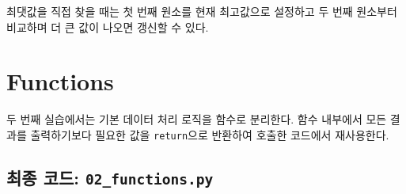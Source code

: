 \documentclass[11pt,a4paper]{article}
\begin{document}
\begin{importantbox}
최댓값을 직접 찾을 때는 첫 번째 원소를 현재 최고값으로 설정하고 두 번째 원소부터 비교하며 더 큰 값이 나오면 갱신할 수 있다.
\end{importantbox}

\section{Functions}

두 번째 실습에서는 기본 데이터 처리 로직을 함수로 분리한다.
함수 내부에서 모든 결과를 출력하기보다 필요한 값을 \texttt{return}으로 반환하여 호출한 코드에서 재사용한다.

\subsection{최종 코드: \texttt{02\_functions.py}}
\end{document}
